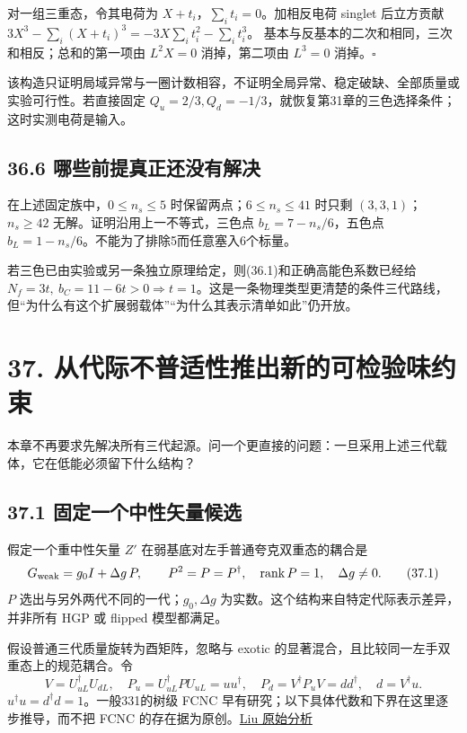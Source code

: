 \documentclass[
  11pt,
  oneside]{book}
\begin{document}
对一组三重态，令其电荷为 \(X+t_i\)，\(\sum_i t_i=0\)。加相反电荷 singlet
后立方贡献 \(3X^3-\sum_i(X+t_i)^3=-3X\sum_i t_i^2-\sum_i t_i^3\)。
基本与反基本的二次和相同，三次和相反；总和的第一项由 \(L^2X=0\)
消掉，第二项由 \(L^3=0\) 消掉。\(\square\)

该构造只证明局域异常与一圈计数相容，不证明全局异常、稳定破缺、全部质量或实验可行性。若直接固定
\(Q_u=2/3,Q_d=-1/3\)，就恢复第31章的三色选择条件；这时实测电荷是输入。

\hypertarget{ux54eaux4e9bux524dux63d0ux771fux6b63ux8fd8ux6ca1ux6709ux89e3ux51b3}{%
\section{36.6
哪些前提真正还没有解决}\label{ux54eaux4e9bux524dux63d0ux771fux6b63ux8fd8ux6ca1ux6709ux89e3ux51b3}}

在上述固定族中，\(0\le n_s\le5\) 时保留两点；\(6\le n_s\le41\) 时只剩
\((3,3,1)\)；\(n_s\ge42\) 无解。证明沿用上一不等式，三色点
\(b_L=7-n_s/6\)，五色点
\(b_L=1-n_s/6\)。不能为了排除5而任意塞入6个标量。

若三色已由实验或另一条独立原理给定，则(36.1)和正确高能色系数已经给
\(N_f=3t,\ b_C=11-6t>0\Rightarrow t=1\)。这是一条物理类型更清楚的条件三代路线，但``为什么有这个扩展弱载体''``为什么其表示清单如此''仍开放。

\hypertarget{ch-37}{%
\chapter{37. 从代际不普适性推出新的可检验味约束}\label{ch-37}}

本章不再要求先解决所有三代起源。问一个更直接的问题：一旦采用上述三代载体，它在低能必须留下什么结构？

\hypertarget{ux56faux5b9aux4e00ux4e2aux4e2dux6027ux77e2ux91cfux5019ux9009}{%
\section{37.1
固定一个中性矢量候选}\label{ux56faux5b9aux4e00ux4e2aux4e2dux6027ux77e2ux91cfux5019ux9009}}

假定一个重中性矢量 \(Z'\) 在弱基底对左手普通夸克双重态的耦合是 \[
G_{\rm weak}=g_0I+\Delta g\,P,\qquad P^2=P=P^\dagger,\quad
\operatorname{rank}P=1,\quad \Delta g\ne0.
\tag{37.1}
\] \(P\) 选出与另外两代不同的一代；\(g_0,\Delta g\)
为实数。这个结构来自特定代际表示差异，并非所有 HGP 或 flipped
模型都满足。

假设普通三代质量旋转为酉矩阵，忽略与 exotic
的显著混合，且比较同一左手双重态上的规范耦合。令 \[
V=U_{uL}^\dagger U_{dL},\quad
P_u=U_{uL}^\dagger PU_{uL}=uu^\dagger,\quad
P_d=V^\dagger P_uV=dd^\dagger,\quad d=V^\dagger u.
\tag{37.2}
\] \(u^\dagger u=d^\dagger d=1\)。一般331的树级 FCNC
早有研究；以下具体代数和下界在这里逐步推导，而不把 FCNC
的存在据为原创。\href{https://arxiv.org/abs/hep-ph/9312312}{Liu
原始分析}
\end{document}
